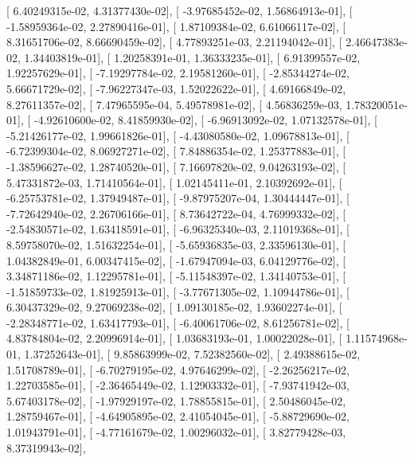 \documentclass{article}
\begin{document}
       [  6.40249315e-02,   4.31377430e-02],
       [ -3.97685452e-02,   1.56864913e-01],
       [ -1.58959364e-02,   2.27890416e-01],
       [  1.87109384e-02,   6.61066117e-02],
       [  8.31651706e-02,   8.66690459e-02],
       [  4.77893251e-03,   2.21194042e-01],
       [  2.46647383e-02,   1.34403819e-01],
       [  1.20258391e-01,   1.36333235e-01],
       [  6.91399557e-02,   1.92257629e-01],
       [ -7.19297784e-02,   2.19581260e-01],
       [ -2.85344274e-02,   5.66671729e-02],
       [ -7.96227347e-03,   1.52022622e-01],
       [  4.69166849e-02,   8.27611357e-02],
       [  7.47965595e-04,   5.49578981e-02],
       [  4.56836259e-03,   1.78320051e-01],
       [ -4.92610600e-02,   8.41859930e-02],
       [ -6.96913092e-02,   1.07132578e-01],
       [ -5.21426177e-02,   1.99661826e-01],
       [ -4.43080580e-02,   1.09678813e-01],
       [ -6.72399304e-02,   8.06927271e-02],
       [  7.84886354e-02,   1.25377883e-01],
       [ -1.38596627e-02,   1.28740520e-01],
       [  7.16697820e-02,   9.04263193e-02],
       [  5.47331872e-03,   1.71410564e-01],
       [  1.02145411e-01,   2.10392692e-01],
       [ -6.25753781e-02,   1.37949487e-01],
       [ -9.87975207e-04,   1.30444447e-01],
       [ -7.72642940e-02,   2.26706166e-01],
       [  8.73642722e-04,   4.76999332e-02],
       [ -2.54830571e-02,   1.63418591e-01],
       [ -6.96325340e-03,   2.11019368e-01],
       [  8.59758070e-02,   1.51632254e-01],
       [ -5.65936835e-03,   2.33596130e-01],
       [  1.04382849e-01,   6.00347415e-02],
       [ -1.67947094e-03,   6.04129776e-02],
       [  3.34871186e-02,   1.12295781e-01],
       [ -5.11548397e-02,   1.34140753e-01],
       [ -1.51859733e-02,   1.81925913e-01],
       [ -3.77671305e-02,   1.10944786e-01],
       [  6.30437329e-02,   9.27069238e-02],
       [  1.09130185e-02,   1.93602274e-01],
       [ -2.28348771e-02,   1.63417793e-01],
       [ -6.40061706e-02,   8.61256781e-02],
       [  4.83784804e-02,   2.20996914e-01],
       [  1.03683193e-01,   1.00022028e-01],
       [  1.11574968e-01,   1.37252643e-01],
       [  9.85863999e-02,   7.52382560e-02],
       [  2.49388615e-02,   1.51708789e-01],
       [ -6.70279195e-02,   4.97646299e-02],
       [ -2.26256217e-02,   1.22703585e-01],
       [ -2.36465449e-02,   1.12903332e-01],
       [ -7.93741942e-03,   5.67403178e-02],
       [ -1.97929197e-02,   1.78855815e-01],
       [  2.50486045e-02,   1.28759467e-01],
       [ -4.64905895e-02,   2.41054045e-01],
       [ -5.88729690e-02,   1.01943791e-01],
       [ -4.77161679e-02,   1.00296032e-01],
       [  3.82779428e-03,   8.37319943e-02],
\end{document}
